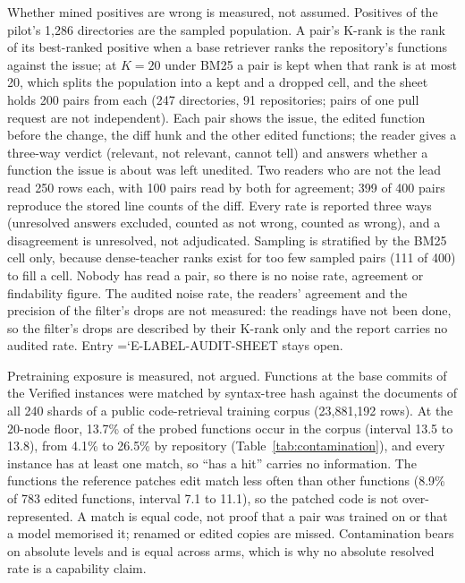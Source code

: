 \documentclass[10pt,twocolumn]{article}
\makeatletter
\renewcommand\paragraph{\@startsection{paragraph}{4}{\z@}{3pt}{-0.5em}{\normalfont\bfseries}}
\newcommand{\entry}[1]{{\ttfamily\hyphenchar\font=`\-\relax #1}}
\makeatother
\begin{document}
\paragraph{Label audit.} Whether mined positives are wrong is measured, not assumed. Positives of the pilot's 1,286 directories are
the sampled population. A pair's K-rank is the rank of its best-ranked positive when a base retriever ranks the
repository's functions against the issue; at $K=20$ under BM25 a pair is kept when that rank is at most 20, which splits the population into a kept and a dropped cell, and the sheet holds 200 pairs from each
(247 directories, 91 repositories; pairs of one pull request are not independent). %
Each pair shows the issue, the edited function before the change, the diff hunk and the other edited functions; the reader gives a
three-way verdict (relevant, not relevant, cannot tell) and answers whether a function the issue is about was left unedited. Two readers
who are not the lead read 250 rows each, with 100 pairs read by both for agreement; 399 of 400 pairs reproduce the stored
line counts of the diff. %
Every rate is reported three ways (unresolved answers excluded, counted as not wrong, counted as wrong), and a disagreement is
unresolved, not adjudicated. Sampling is stratified by the BM25 cell only, because dense-teacher ranks exist for too few sampled pairs
(111 of 400) to fill a cell. %
Nobody has read a pair, so there is no noise rate, agreement or findability figure.
The audited noise rate, the readers' agreement and the precision of the filter's drops are not measured: the readings have not been done, so the filter's drops are described by their K-rank only and the report carries no audited rate. Entry \entry{E-LABEL-AUDIT-SHEET} stays open.

\paragraph{Contamination.} Pretraining exposure is measured, not argued. Functions at the base commits of the Verified
instances were matched by syntax-tree hash against the documents of all 240 shards of a public code-retrieval training corpus
(23,881,192 rows). %
At the 20-node floor, 13.7\% of the probed functions occur in the corpus (interval 13.5 to 13.8), from 4.1\% to 26.5\% by repository
(Table~\ref{tab:contamination}), and every instance has at least one match, so ``has a hit'' carries no information. %
The functions the reference patches edit match less often than other functions (8.9\% of 783 edited functions, interval 7.1 to 11.1), so
the patched code is not over-represented. %
A match is equal code, not proof that a pair was trained on or that a model memorised it; renamed or edited copies are missed.
Contamination bears on absolute levels and is equal across arms, which is why no absolute resolved rate is a capability claim.
\end{document}
